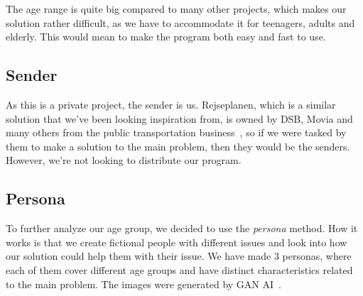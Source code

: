 The age range is quite big compared to many other projects, which makes our solution rather difficult, as we have to
accommodate it for teenagers, adults and elderly.
This would mean to make the program both easy and fast to use.

\subsection{Sender}\label{subsec:sender}

As this is a private project, the sender is us.
Rejseplanen, which is a similar solution that we've been looking inspiration from, is owned by DSB, Movia and many
others from the public transportation business~\cite{om_rejseplanen}, so if we were tasked by them to make a solution to
the main problem, then they would be the senders.
However, we're not looking to distribute our program.

\subsection{Persona}\label{subsec:persona}

To further analyze our age group, we decided to use the \textit{persona} method.
How it works is that we create fictional people with different issues and look into how our solution could help them
with their issue.
We have made 3 personas, where each of them cover different age groups and have distinct characteristics related to the
main problem.
The images were generated by GAN AI~\cite{thispersondoesnotexist}.


\renewcommand{\arraystretch}{1.5}

